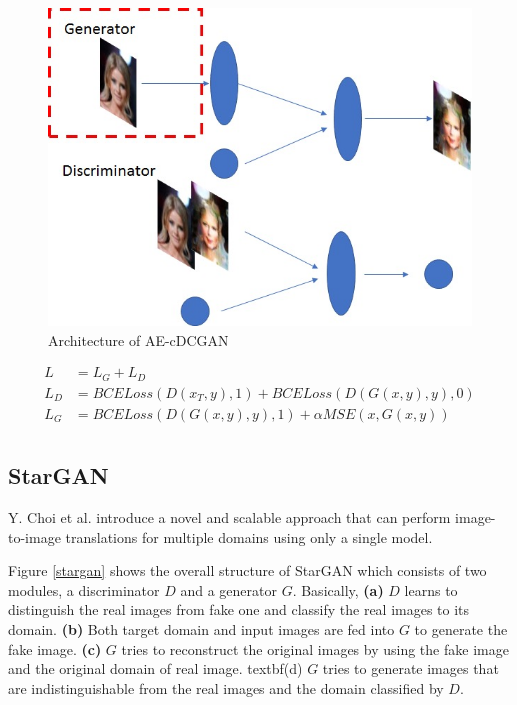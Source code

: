 \documentclass{article}
\begin{document}
\begin{figure}[H]
\begin{center}
  \centering
  \includegraphics[scale=0.5]{image/cdcgan_structure.jpg}
\end{center}
\caption{Architecture of AE-cDCGAN}
\label{AE-cDCGAN}
\end{figure}

\begin{equation}
\begin{split}
L &= L_G + L_D\\
L_D &= BCELoss(D(x_T,y),1) + BCELoss(D(G(x,y),y),0)\\
L_G &= BCELoss(D(G(x,y),y),1) + \alpha MSE(x,G(x,y))\\
\end{split}
\label{equation: AE_loss}
\end{equation}

\subsection{StarGAN}
Y. Choi et al. \cite{DBLP:journals/corr/abs-1711-09020} introduce a novel and scalable approach that can perform image-to-image translations for multiple domains using only a single model.

Figure \ref{stargan} shows the overall structure of StarGAN which consists of two modules, a discriminator $D$ and a generator $G$. Basically, \textbf{(a)} $D$ learns to distinguish the real images from fake one and classify the real images to its domain. \textbf{(b)} Both target domain and input images are fed into $G$ to generate the fake image. \textbf{(c)} $G$ tries to reconstruct the original images by using the fake image and the original domain of real image. textbf{(d)} $G$ tries to generate images that are indistinguishable from the real images and the domain classified by $D$.
\end{document}
